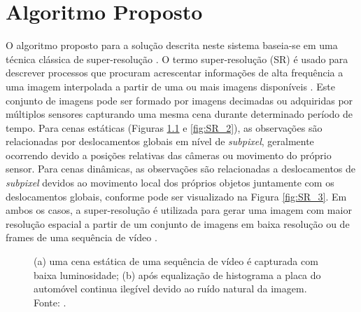 \chapter[Algoritmo Proposto]{Algoritmo Proposto}

O algoritmo proposto para a solução descrita neste sistema baseia-se em uma técnica clássica de super-resolução \cite{garcia2013tecnicas}. O termo super-resolução (SR) é usado para descrever processos que procuram acrescentar informações de alta frequência a uma imagem interpolada a partir de uma ou mais imagens disponíveis \cite{baker2002limits,park2003super,farsiu2004advances}. Este conjunto de imagens pode ser formado por imagens decimadas ou adquiridas por múltiplos sensores capturando uma mesma cena durante determinado período de tempo. Para cenas estáticas (Figuras \ref{fig:SR_1} e \ref{fig:SR_2}), as observações são relacionadas por deslocamentos globais em nível de \textit{subpixel}, geralmente ocorrendo devido a posições relativas das câmeras ou movimento do próprio sensor. Para cenas dinâmicas, as observações são relacionadas a deslocamentos de \textit{subpixel} devidos ao movimento local dos próprios objetos juntamente com os deslocamentos globais, conforme pode ser visualizado na Figura \ref{fig:SR_3}. Em ambos os casos, a super-resolução é utilizada para gerar uma imagem com maior resolução espacial a partir de um conjunto de imagens em baixa resolução ou de frames de uma sequência de vídeo \cite{figueira2013super}\cite{milanfar2010super}.
\\

\begin{figure}[h]
    \centering
    \qquad
    \caption{(a) uma cena estática de uma sequência de vídeo é capturada com baixa luminosidade; (b) após equalização de histograma a placa do automóvel continua ilegível devido ao ruído natural da imagem. Fonte: \cite{kang2000digital}. }%
	    \label{fig:SR_1}
\end{figure}


